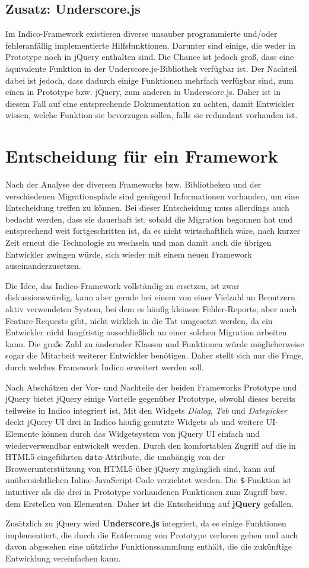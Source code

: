 \subsection{Zusatz: Underscore.js}
Im Indico-Framework existieren diverse unsauber programmierte und/oder fehleranfällig implementierte
Hilfsfunktionen.  Darunter sind einige, die weder in Prototype noch in jQuery enthalten sind.  Die
Chance ist jedoch groß, dass eine äquivalente Funktion in der Underscore.js-Bibliothek verfügbar
ist. Der Nachteil dabei ist jedoch, dass dadurch einige Funktionen mehrfach verfügbar sind, zum
einen in Prototype bzw. jQuery, zum anderen in Underscore.js. Daher ist in diesem Fall auf eine
entsprechende Dokumentation zu achten, damit Entwickler wissen, welche Funktion sie bevorzugen
sollen, falls sie redundant vorhanden ist.


\section{Entscheidung für ein Framework}

Nach der Analyse der diversen Frameworks bzw. Bibliotheken und der verschiedenen Migrationspfade
sind genügend Informationen vorhanden, um eine Entscheidung treffen zu können. Bei dieser
Entscheidung muss allerdings auch bedacht werden, dass sie dauerhaft ist, sobald die Migration
begonnen hat und entsprechend weit fortgeschritten ist, da es nicht wirtschaftlich wäre, nach kurzer
Zeit erneut die Technologie zu wechseln und man damit auch die übrigen Entwickler zwingen würde,
sich wieder mit einem neuen Framework auseinanderzusetzen.

Die Idee, das Indico-Framework vollständig zu ersetzen, ist zwar diskussionswürdig, kann aber gerade
bei einem von einer Vielzahl an Benutzern aktiv verwendeten System, bei dem es häufig kleinere
Fehler-Reports, aber auch Feature-Requests gibt, nicht wirklich in die Tat umgesetzt werden, da ein
Entwickler nicht langfristig ausschließlich an einer solchen Migration arbeiten kann. Die große
Zahl zu ändernder Klassen und Funktionen würde möglicherweise sogar die Mitarbeit weiterer
Entwickler benötigen. Daher stellt sich nur die Frage, durch welches Framework Indico erweitert
werden soll.

Nach Abschätzen der Vor- und Nachteile der beiden Frameworks Prototype und jQuery bietet jQuery
einige Vorteile gegenüber Prototype, obwohl dieses bereits teilweise in Indico integriert ist. Mit
den Widgets \emph{Dialog}, \emph{Tab} und \emph{Datepicker} deckt jQuery UI drei in Indico häufig
genutzte Widgets ab und weitere UI-Elemente können durch das Widgetsystem von jQuery UI einfach und
wiederverwendbar entwickelt werden. Durch den komfortablen Zugriff auf die in HTML5 eingeführten
\lstinline{data}-Attribute, die unabängig von der Browserunterstützung von HTML5 über jQuery
zugänglich sind, kann auf unübersichtlichen Inline-JavaScript-Code verzichtet werden. Die
\lstinline{$}-Funktion ist intuitiver als die drei in Prototype vorhandenen Funktionen zum Zugriff
bzw. dem Erstellen von Elementen. Daher ist die Entscheidung auf \textbf{jQuery} gefallen.

Zusätzlich zu jQuery wird \textbf{Underscore.js} integriert, da es einige Funktionen implementiert,
die durch die Entfernung von Prototype verloren gehen und auch davon abgesehen eine nützliche
Funktionssammlung enthält, die die zukünftige Entwicklung vereinfachen kann.

